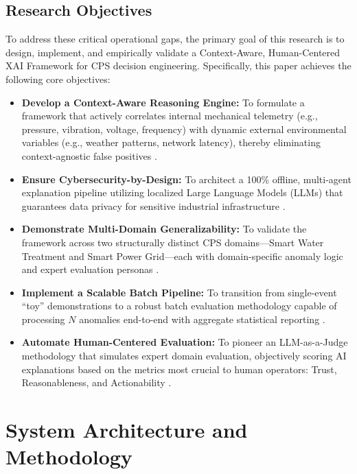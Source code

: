 \documentclass[a4paper,fleqn]{cas-dc}
\begin{document}
\subsection{Research Objectives}
To address these critical operational gaps, the primary goal of this research is to design, implement, and empirically validate a Context-Aware, Human-Centered XAI Framework for CPS decision engineering. Specifically, this paper achieves the following core objectives:

\begin{itemize}
    \item \textbf{Develop a Context-Aware Reasoning Engine:} To formulate a framework that actively correlates internal mechanical telemetry (e.g., pressure, vibration, voltage, frequency) with dynamic external environmental variables (e.g., weather patterns, network latency), thereby eliminating context-agnostic false positives \cite{ref6, ref7}.
    \item \textbf{Ensure Cybersecurity-by-Design:} To architect a 100\% offline, multi-agent explanation pipeline utilizing localized Large Language Models (LLMs) that guarantees data privacy for sensitive industrial infrastructure \cite{ref10, ref_llama}.
    \item \textbf{Demonstrate Multi-Domain Generalizability:} To validate the framework across two structurally distinct CPS domains---Smart Water Treatment and Smart Power Grid---each with domain-specific anomaly logic and expert evaluation personas \cite{ref4, ref5}.
    \item \textbf{Implement a Scalable Batch Pipeline:} To transition from single-event ``toy'' demonstrations to a robust batch evaluation methodology capable of processing $N$ anomalies end-to-end with aggregate statistical reporting \cite{ref_batch_eval}.
    \item \textbf{Automate Human-Centered Evaluation:} To pioneer an LLM-as-a-Judge methodology \cite{ref_llm_judge} that simulates expert domain evaluation, objectively scoring AI explanations based on the metrics most crucial to human operators: Trust, Reasonableness, and Actionability \cite{ref17, ref38}.
\end{itemize}

\section{System Architecture and Methodology}
\end{document}
